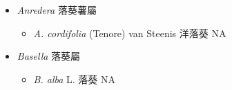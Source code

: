
  \begin{itemize}
 \item[] \textit{Anredera} 落葵薯屬
                                
  \begin{itemize}
        \item[] \textit{A. cordifolia} (Tenore) van Steenis  洋落葵   NA
  \end{itemize}
 \item[] \textit{Basella} 落葵屬
                                
  \begin{itemize}
        \item[] \textit{B. alba} L.  落葵   NA
  \end{itemize}
  \end{itemize}
